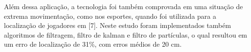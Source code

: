Além dessa aplicação, a tecnologia foi também comprovada em uma situação de extrema movimentação, como nos esportes, quando foi utilizada para a localização de jogadores em [7]. Neste estudo foram implementados também algoritmos de filtragem, filtro de kalman e filtro de partículas, o qual resultou em um erro de localização de 31\%, com erros médios de 20 cm. 




